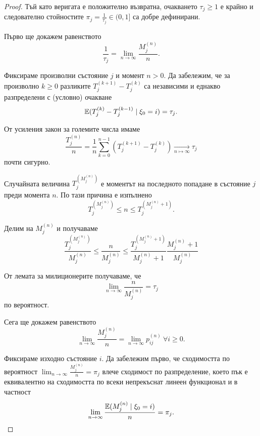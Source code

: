 \documentclass[numbers=endperiod, DIV=15, bibliography=totocnumbered]{scrartcl}
\begin{document}
\begin{proof}
  Тъй като веригата е положително възвратна, очакването $\tau_j \geq 1$ е крайно и следователно стойностите $\pi_j = \frac 1 {\tau_j} \in (0, 1]$ са добре дефинирани.

  Първо ще докажем равенството
  \begin{displaymath}
    \frac 1 {\tau_j}
    =
    \lim_{n \to \infty} \frac {M^{(n)}_j} n.
  \end{displaymath}

  Фиксираме произволни състояние $j$ и момент $n > 0$. Да забележим, че за произволно $k \geq 0$ разликите $T_j^{(k+1)} - T_j^{(k)}$ са независими и еднакво разпределени с (условно) очакване
  \begin{displaymath}
   \mathbb{E}(T_j^{(k)} - T_j^{(k-1)} \mid \xi_0 = i) = \tau_j.
  \end{displaymath}

  От усиления закон за големите числа имаме
  \begin{displaymath}
    \frac {T_j^{(n)}} n = \frac 1 n \sum_{k=0}^{n-1} (T_j^{(k+1)} - T_j^{(k)}) \underset {n \mapsto \infty} \longrightarrow \tau_j
  \end{displaymath}
  почти сигурно.

  Случайната величина $T_j^{(M_j^{(n)})}$ е моментът на последното попадане в състояние $j$ преди момента $n$. По тази причина е изпълнено
  \begin{displaymath}
    T_j^{(M_j^{(n)})} \leq n \leq T_j^{(M_j^{(n)} + 1)}.
  \end{displaymath}

  Делим на $M_j^{(n)}$ и получаваме
  \begin{displaymath}
    \frac {T_j^{(M_j^{(n)})}} {M_j^{(n)}} \leq \frac n {M_j^{(n)}} \leq \frac {T_j^{(M_j^{(n)} + 1)}} {M_j^{(n)} + 1} \frac {M_j^{(n)} + 1} {M_j^{(n)}}
  \end{displaymath}

  От лемата за милиционерите получаваме, че
  \begin{displaymath}
    \lim_{n \to \infty} \frac n {M^{(n)}_j}
    =
    \tau_j
  \end{displaymath}
  по вероятност.

  Сега ще докажем равенството
  \begin{displaymath}
    \lim_{n \to \infty} \frac {M^{(n)}_j} n
    =
    \lim_{n \to \infty} p_{ij}^{(n)}~\forall i \geq 0.
  \end{displaymath}

  Фиксираме изходно състояние $i$. Да забележим първо, че сходимостта по вероятност $\lim_{n \to \infty} \frac {M^{(n)}_j} n = \pi_j$ влече сходимост по разпределение, което пък е еквивалентно на сходимостта по всеки непрекъснат линеен функционал и в частност
  \begin{displaymath}
    \lim_{n \to \infty} \frac {\mathbb{E}(M^{(n)}_j \mid \xi_0 = i)} n = \pi_j.
  \end{displaymath}


\end{proof}
\end{document}
